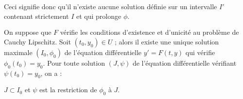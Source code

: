\begin{rem}
Ceci signifie donc qu'il n'existe aucune solution
définie sur un intervalle $I'$ contenant strictement $I$ et qui prolonge $\phi$.
\end{rem}

\begin{thm}
On suppose que $F$ vérifie les conditions
d'existence et d'unicité au problème de Cauchy Lipschitz. Soit
$(t_0,y_0) \in U$ ; alors il existe une unique solution
maximale $(I_0,\phi_0)$ de l'équation différentielle $y' =
F(t,y)$ qui vérifie $\phi_0(t_0) = y_0$. Pour toute
solution $(J,\psi)$ de l'équation différentielle vérifiant $\psi(t_0) =
y_0$, on a :

$J \subset I_0$ et $\psi$ est la restriction
de $\phi_0$ à $J$.
\end{thm}

